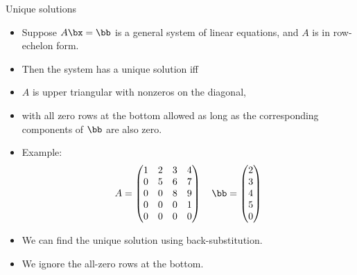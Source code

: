 \documentclass{beamer}
\begin{document}

\begin{frame}{Unique solutions}

\begin{itemize}
\item Suppose $A\bx=\bb$ is a general system of linear equations, and $A$ is in row-echelon form.
\item Then the system has a unique solution iff
\item $A$ is  upper triangular with nonzeros on the diagonal,
\item with all zero rows at the bottom allowed as long as the corresponding components of $\bb$ are also zero.
\item Example:
$$
A =
\begin{pmatrix}
1 & 2 & 3 & 4 \\
0 & 5 & 6 & 7 \\
0 & 0 & 8 & 9 \\
0 & 0 & 0 & 1 \\
0 & 0 & 0 & 0 \\
\end{pmatrix}
\quad
\bb=
\begin{pmatrix}
2 \\ 3 \\ 4 \\ 5 \\ 0
\end{pmatrix}
$$
\item We can find the unique solution using back-substitution.
\item We ignore the all-zero rows at the bottom.

\end{itemize}
\end{frame}
\end{document}
